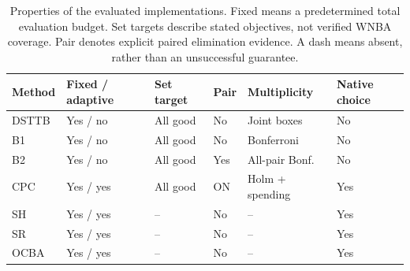 \begin{table}[tbp]\centering\footnotesize
\caption{Properties of the evaluated implementations. Fixed means a predetermined total evaluation budget. Set targets describe stated objectives, not verified WNBA coverage. Pair denotes explicit paired elimination evidence. A dash means absent, rather than an unsuccessful guarantee.}\label{tab:methods}
\begin{tabularx}{\linewidth}{lXXXXl}\toprule
Method & Fixed / adaptive & Set target & Pair & Multiplicity & Native choice \\ \midrule
DSTTB & Yes / no & All good & No & Joint boxes & No \\
B1 & Yes / no & All good & No & Bonferroni & No \\
B2 & Yes / no & All good & Yes & All-pair Bonf. & No \\
CPC & Yes / yes & All good & ON & Holm + spending & Yes \\
SH & Yes / yes & -- & No & -- & Yes \\
SR & Yes / yes & -- & No & -- & Yes \\
OCBA & Yes / yes & -- & No & -- & Yes \\
\bottomrule\end{tabularx}
\end{table}
